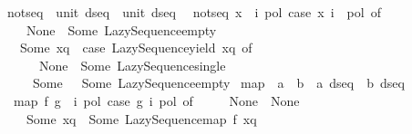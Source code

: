 \begin{isabellebody}
\ not{\isacharunderscore}{\kern0pt}seq\ {\isacharcolon}{\kern0pt}{\isacharcolon}{\kern0pt}\ {\isachardoublequoteopen}unit\ dseq\ {\isasymRightarrow}\ unit\ dseq{\isachardoublequoteclose}\isanewline
{}\isanewline
\ \ {\isachardoublequoteopen}not{\isacharunderscore}{\kern0pt}seq\ x\ {\isacharequal}{\kern0pt}\ {\isacharparenleft}{\kern0pt}{\isasymlambda}i\ pol{\isachardot}{\kern0pt}\ case\ x\ i\ {\isacharparenleft}{\kern0pt}{\isasymnot}\ pol{\isacharparenright}{\kern0pt}\ of\isanewline
\ \ \ \ None\ {\isasymRightarrow}\ Some\ Lazy{\isacharunderscore}{\kern0pt}Sequence{\isachardot}{\kern0pt}empty\isanewline
\ \ {\isacharbar}{\kern0pt}\ Some\ xq\ {\isasymRightarrow}\ {\isacharparenleft}{\kern0pt}case\ Lazy{\isacharunderscore}{\kern0pt}Sequence{\isachardot}{\kern0pt}yield\ xq\ of\isanewline
\ \ \ \ \ \ None\ {\isasymRightarrow}\ Some\ {\isacharparenleft}{\kern0pt}Lazy{\isacharunderscore}{\kern0pt}Sequence{\isachardot}{\kern0pt}single\ {\isacharparenleft}{\kern0pt}{\isacharparenright}{\kern0pt}{\isacharparenright}{\kern0pt}\isanewline
\ \ \ \ {\isacharbar}{\kern0pt}\ Some\ {\isacharunderscore}{\kern0pt}\ {\isasymRightarrow}\ Some\ {\isacharparenleft}{\kern0pt}Lazy{\isacharunderscore}{\kern0pt}Sequence{\isachardot}{\kern0pt}empty{\isacharparenright}{\kern0pt}{\isacharparenright}{\kern0pt}{\isacharparenright}{\kern0pt}{\isachardoublequoteclose}\isanewline
\isanewline
{}\isamarkupfalse%
\ map\ {\isacharcolon}{\kern0pt}{\isacharcolon}{\kern0pt}\ {\isachardoublequoteopen}{\isacharparenleft}{\kern0pt}{\isacharprime}{\kern0pt}a\ {\isasymRightarrow}\ {\isacharprime}{\kern0pt}b{\isacharparenright}{\kern0pt}\ {\isasymRightarrow}\ {\isacharprime}{\kern0pt}a\ dseq\ {\isasymRightarrow}\ {\isacharprime}{\kern0pt}b\ dseq{\isachardoublequoteclose}\isanewline
{}\isanewline
\ \ {\isachardoublequoteopen}map\ f\ g\ {\isacharequal}{\kern0pt}\ {\isacharparenleft}{\kern0pt}{\isasymlambda}i\ pol{\isachardot}{\kern0pt}\ case\ g\ i\ pol\ of\isanewline
\ \ \ \ \ None\ {\isasymRightarrow}\ None\isanewline
\ \ \ {\isacharbar}{\kern0pt}\ Some\ xq\ {\isasymRightarrow}\ Some\ {\isacharparenleft}{\kern0pt}Lazy{\isacharunderscore}{\kern0pt}Sequence{\isachardot}{\kern0pt}map\ f\ xq{\isacharparenright}{\kern0pt}{\isacharparenright}{\kern0pt}{\isachardoublequoteclose}%
\isadelimdocument
%
\endisadelimdocument
%
\isatagdocument
%
\isamarkuptrue%
%
\endisatagdocument
{\isafolddocument}%
%
\isadelimdocument
%
\endisadelimdocument
{}\isamarkupfalse%

\end{isabellebody}
